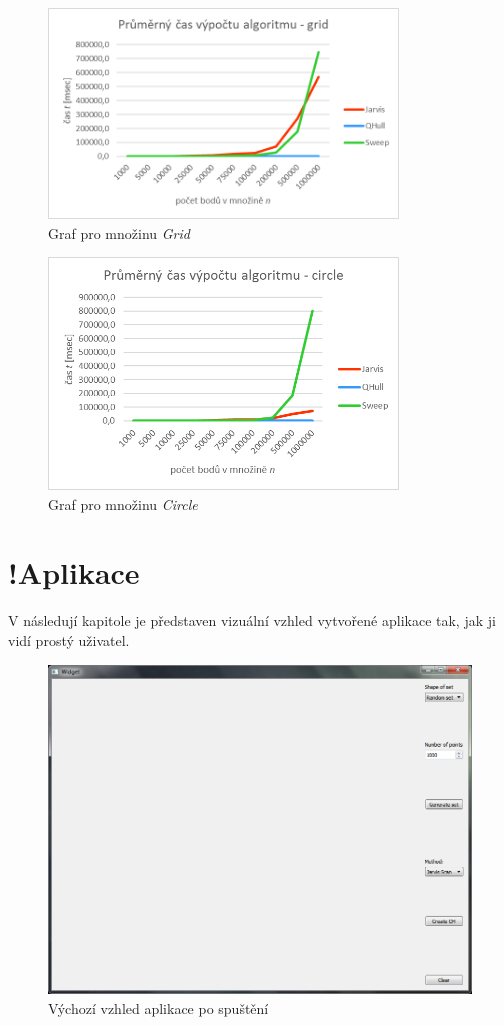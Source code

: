 \documentclass[a4paper, 12pt]{article}
\begin{document}
\begin{figure}[h!]
	\centering
	\includegraphics[width=9.3cm]{./pictures/g_grid_all.png}
	\caption{Graf pro množinu \textit{Grid}}
\end{figure}

\begin{figure}[h!]
	\centering
	\includegraphics[width=9.3cm]{./pictures/g_circ_all.png}
	\caption{Graf pro množinu \textit{Circle}}
\end{figure}

\clearpage
\section{!Aplikace}
V následují kapitole je představen vizuální vzhled vytvořené aplikace tak, jak ji vidí prostý uživatel.

\begin{figure}[h!]
	\centering
	\includegraphics[width=11.5cm]{./pictures/app_default.png}
	\caption{Výchozí vzhled aplikace po spuštění}
\end{figure}
\end{document}
